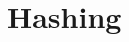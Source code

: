 
\ifsubfile
\usepackage{../settings/subfile}
\setcounter{chapter}{8}


\fi
\chapter{Hashing}

\ifsubfile

\fi
